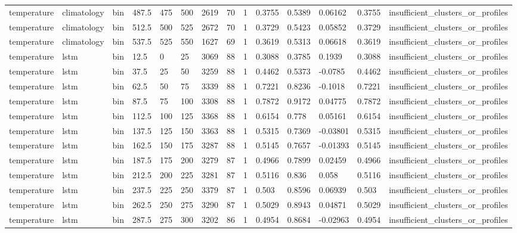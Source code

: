 \begin{table}[htbp]
\begin{tabular}{llllllllllllll}
temperature & climatology & bin & 487.5 & 475 & 500 & 2619 & 70 & 1 & 0.3755 & 0.5389 & 0.06162 & 0.3755 & insufficient\_clusters\_or\_profiles \\
temperature & climatology & bin & 512.5 & 500 & 525 & 2672 & 70 & 1 & 0.3729 & 0.5423 & 0.05852 & 0.3729 & insufficient\_clusters\_or\_profiles \\
temperature & climatology & bin & 537.5 & 525 & 550 & 1627 & 69 & 1 & 0.3619 & 0.5313 & 0.06618 & 0.3619 & insufficient\_clusters\_or\_profiles \\
temperature & lstm & bin & 12.5 & 0 & 25 & 3069 & 88 & 1 & 0.3088 & 0.3785 & 0.1939 & 0.3088 & insufficient\_clusters\_or\_profiles \\
temperature & lstm & bin & 37.5 & 25 & 50 & 3259 & 88 & 1 & 0.4462 & 0.5373 & -0.0785 & 0.4462 & insufficient\_clusters\_or\_profiles \\
temperature & lstm & bin & 62.5 & 50 & 75 & 3339 & 88 & 1 & 0.7221 & 0.8236 & -0.1018 & 0.7221 & insufficient\_clusters\_or\_profiles \\
temperature & lstm & bin & 87.5 & 75 & 100 & 3308 & 88 & 1 & 0.7872 & 0.9172 & 0.04775 & 0.7872 & insufficient\_clusters\_or\_profiles \\
temperature & lstm & bin & 112.5 & 100 & 125 & 3368 & 88 & 1 & 0.6154 & 0.778 & 0.05161 & 0.6154 & insufficient\_clusters\_or\_profiles \\
temperature & lstm & bin & 137.5 & 125 & 150 & 3363 & 88 & 1 & 0.5315 & 0.7369 & -0.03801 & 0.5315 & insufficient\_clusters\_or\_profiles \\
temperature & lstm & bin & 162.5 & 150 & 175 & 3287 & 88 & 1 & 0.5145 & 0.7657 & -0.01393 & 0.5145 & insufficient\_clusters\_or\_profiles \\
temperature & lstm & bin & 187.5 & 175 & 200 & 3279 & 87 & 1 & 0.4966 & 0.7899 & 0.02459 & 0.4966 & insufficient\_clusters\_or\_profiles \\
temperature & lstm & bin & 212.5 & 200 & 225 & 3281 & 87 & 1 & 0.5116 & 0.836 & 0.058 & 0.5116 & insufficient\_clusters\_or\_profiles \\
temperature & lstm & bin & 237.5 & 225 & 250 & 3379 & 87 & 1 & 0.503 & 0.8596 & 0.06939 & 0.503 & insufficient\_clusters\_or\_profiles \\
temperature & lstm & bin & 262.5 & 250 & 275 & 3290 & 87 & 1 & 0.5029 & 0.8943 & 0.04871 & 0.5029 & insufficient\_clusters\_or\_profiles \\
temperature & lstm & bin & 287.5 & 275 & 300 & 3202 & 86 & 1 & 0.4954 & 0.8684 & -0.02963 & 0.4954 & insufficient\_clusters\_or\_profiles \\

\end{tabular}
\end{table}
